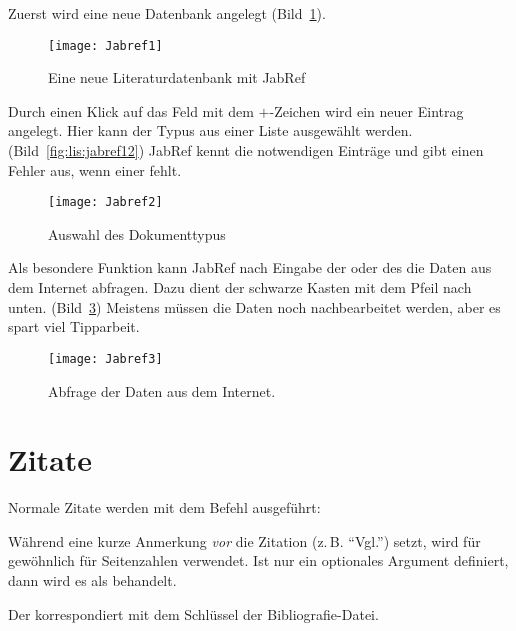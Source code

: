 Zuerst wird eine neue Datenbank angelegt (Bild~\ref{fig:lis:jabref1}).

\begin{figure}
  \texttt{[image: Jabref1]}
  \caption{Eine neue Literaturdatenbank mit JabRef}
  \label{fig:lis:jabref1}
\end{figure}

Durch einen Klick auf das Feld mit dem $+$-Zeichen wird ein neuer Eintrag angelegt.
Hier kann der Typus aus einer Liste ausgewählt werden. (Bild~\ref{fig:lis:jabref12})
JabRef kennt die notwendigen Einträge und gibt einen Fehler aus, wenn einer fehlt.

\begin{figure}
  \texttt{[image: Jabref2]}
  \caption{Auswahl des Dokumenttypus}
  \label{fig:lis:jabref2}
\end{figure}

Als besondere Funktion kann JabRef nach Eingabe der  oder des  die Daten
aus dem Internet abfragen. Dazu dient der schwarze Kasten mit dem Pfeil nach unten. (Bild~\ref{fig:lis:jabref3})
Meistens müssen die Daten noch nachbearbeitet werden, aber es spart viel Tipparbeit.

\begin{figure}
  \texttt{[image: Jabref3]}
  \caption{Abfrage der Daten aus dem Internet.}
  \label{fig:lis:jabref3}
\end{figure}

\section{Zitate}\label{sec:zitate}\label{lit:cite-befehle}

Normale Zitate werden mit dem Befehl  ausgeführt:

Während   eine kurze Anmerkung \emph{vor} die Zitation (z.\,B. \enquote{Vgl.}) setzt, 
wird   für gewöhnlich für Seitenzahlen verwendet.
Ist nur ein optionales Argument definiert, 
dann wird es als  behandelt.
Der  korrespondiert mit dem Schlüssel der Bibliografie-Datei.

